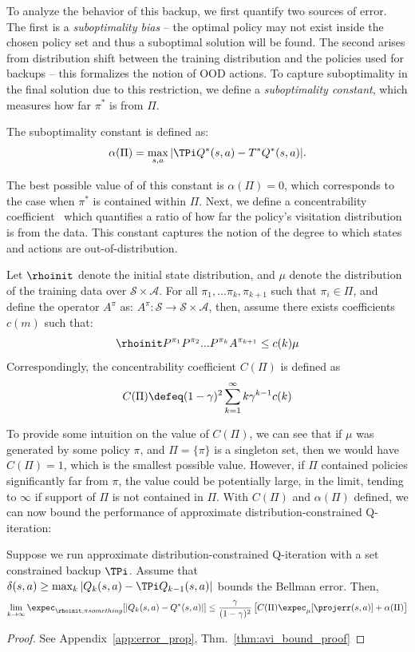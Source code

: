 To analyze the behavior of this backup, we first quantify two sources of error. The first is a \emph{suboptimality bias} -- the optimal policy may not exist inside the chosen policy set and thus a suboptimal solution will be found. The second arises from distribution shift between the training distribution and the policies used for backups -- this formalizes the notion of OOD actions. %
To capture suboptimality in the final solution due to this restriction, we define a \emph{suboptimality constant}, which measures how far $\pi^*$ is from $\Pi$. 
\begin{definition}
The suboptimality constant is defined as:
\[ \alpha(\Pi) = \max_{s,a} |\TPi Q^*(s, a) - T^* Q^*(s, a)|. \]
\end{definition}
The best possible value of of this constant is $\alpha(\Pi) = 0$, which corresponds to the case when $\pi^*$ is contained within $\Pi$. Next, we define a concentrability coefficient~\citep{munos2005erroravi} which quantifies a ratio of how far the policy's visitation distribution is from the data. This constant captures the notion of the degree to which states and actions are out-of-distribution.
\begin{assumption}[Concentrability]
Let $\rhoinit$ denote the initial state distribution, and $\mu$ denote the distribution of the training data over $\mathcal{S} \times \mathcal{A}$. For all $\pi_1, ... \pi_k, \pi_{k+1}$ such that $\pi_i \in \Pi$, and define the operator $A^{\pi}$ as: $A^{\pi}: \mathcal{S} \rightarrow \mathcal{S} \times \mathcal{A}$, then, assume there exists coefficients $c(m)$ such that:
\[
\rhoinit P^{\pi_1}P^{\pi_2}...P^{\pi_k} A^{\pi_{k+1}} \le c(k) \mu
\]
Correspondingly, the concentrability coefficient $C(\Pi)$ is defined as
\[
C(\Pi) \defeq (1-\gamma)^2\sum_{k=1}^\infty k\gamma^{k-1}c(k)
\]
\end{assumption}
To provide some intuition on the value of $C(\Pi)$, we can see that if $\mu$ was generated by some policy $\pi$, and $\Pi = \{\pi\}$ is a singleton set, then we would have $C(\Pi)=1$, which is the smallest possible value. However, if $\Pi$ contained policies significantly far from $\pi$, the value could be potentially large, in the limit, tending to $\infty$ if support of $\Pi$ is not contained in $\Pi$. With $C(\Pi)$ and $\alpha(\Pi)$ defined, we can now bound the performance of approximate distribution-constrained Q-iteration:
\begin{theorem}
\label{thm:avi_bound}
Suppose we run approximate distribution-constrained Q-iteration with a set constrained backup $\TPi$. Assume that $\delta(s,a) \ge \max_k |Q_k(s,a) - \TPi Q_{k-1}(s,a)|$ bounds the Bellman error. Then,
\[\lim_{k \to \infty} \expec_{\rhoinit, \pi something}[|Q_k(s,a) - Q^*(s,a)|] \le 
\frac{\gamma}{(1-\gamma)^2}\left[ C(\Pi)\expec_\mu[\projerr(s,a)] + \alpha(\Pi) \right]
\]
\end{theorem}
\begin{proof} See Appendix~\ref{app:error_prop}, Thm.~\ref{thm:avi_bound_proof} \end{proof}

